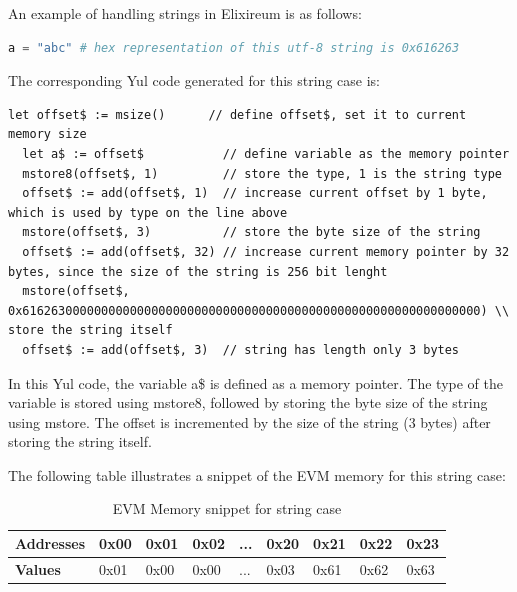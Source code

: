 An example of handling strings in Elixireum is as follows:

\begin{lstlisting}[caption={Elixireum code for string case}, language=elixir]
  a = "abc" # hex representation of this utf-8 string is 0x616263
\end{lstlisting}
  
The corresponding Yul code generated for this string case is:

\begin{lstlisting}[caption={Generated yul code for string case}, language=yul]
  let offset$ := msize()      // define offset$, set it to current memory size 
  let a$ := offset$           // define variable as the memory pointer
  mstore8(offset$, 1)         // store the type, 1 is the string type
  offset$ := add(offset$, 1)  // increase current offset by 1 byte, which is used by type on the line above
  mstore(offset$, 3)          // store the byte size of the string
  offset$ := add(offset$, 32) // increase current memory pointer by 32 bytes, since the size of the string is 256 bit lenght
  mstore(offset$, 0x6162630000000000000000000000000000000000000000000000000000000000) \\ store the string itself
  offset$ := add(offset$, 3)  // string has length only 3 bytes
\end{lstlisting}

In this Yul code, the variable a\$ is defined as a memory pointer. The type of the variable is stored using mstore8, followed by storing the byte size of the string using mstore. The offset is incremented by the size of the string (3 bytes) after storing the string itself.

The following table illustrates a snippet of the EVM memory for this string case:

\begin{table}[h!]
  \centering
  \renewcommand{\arraystretch}{1.2} %
  \begin{tabular}{|>{\centering\arraybackslash}m{2cm}|>{\centering\arraybackslash}m{1cm}|>{\centering\arraybackslash}m{1cm}|>{\centering\arraybackslash}m{1cm}|>{\centering\arraybackslash}m{0.75cm}|>{\centering\arraybackslash}m{1cm}|>{\centering\arraybackslash}m{1cm}|>{\centering\arraybackslash}m{1cm}|>{\centering\arraybackslash}m{1cm}|}
  \hline
  \textbf{Addresses} & 0x00 & 0x01 & 0x02 & ... & 0x20 & 0x21 & 0x22 & 0x23 \\ \hline
  \textbf{Values}    & 0x01 & 0x00 & 0x00 & ... & 0x03 & 0x61 & 0x62 & 0x63 \\ \hline
  \end{tabular}
  \caption{EVM Memory snippet for string case}
  \label{tab:evm_memory}
  \end{table}

